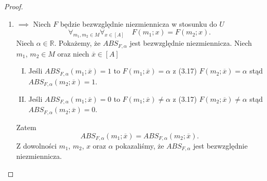 \documentclass[12pt,a4paper]{report}
\newcommand{\domkniecie}[1]{\left\lbrack{#1}\right\rbrack}
\begin{document}
\begin{proof}
\begin{enumerate}
\item
$\implies$
Niech $F$ będzie bezwzględnie niezmiennicza w stosunku do $U$ 
\begin{equation}
\forall_{m_{1}, m_{2} \in M}  \forall_{x \in \domkniecie{A}} \quad F(m_{1};x)=F(m_{2};x).
\end{equation}
Niech $\alpha \in \mathbb{R}$. Pokażemy, że $ABS_{F,\alpha}$ jest bezwzględnie niezmiennicza. Niech $m_1$, $m_2 \in M$ oraz niech $\overline{x} \in \domkniecie{A}$ 
\begin{enumerate}[I.]
\item
Jeśli $ABS_{F,\alpha}(m_1;\overline{x})=1$ to $F(m_1;\overline{x})=\alpha$ z (3.17) $F(m_2;\overline{x})=\alpha$ stąd $ABS_{F,\alpha}(m_2;\overline{x})=1$.
\item
Jeśli $ABS_{F,\alpha}(m_1;\overline{x})=0$ to $F(m_1;\overline{x})\ne \alpha$ z (3.17) $F(m_2;\overline{x})\ne\alpha$ stąd $ABS_{F,\alpha}(m_2;\overline{x})=0$.
\end{enumerate}
Zatem 
$$
ABS_{F,\alpha}(m_1;\overline{x})=ABS_{F,\alpha}(m_2;\overline{x}).
$$
Z dowolności $m_1$, $m_2$, $x$ oraz $\alpha$ pokazaliśmy, że $ABS_{F,\alpha}$ jest bezwzględnie niezmiennicza.


\end{enumerate}
\end{proof}
\end{document}
